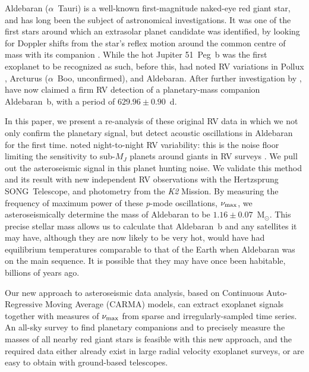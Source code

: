 \documentclass[modern]{aastex61}
\newcommand{\numax}{\mbox{$\nu_{\rm max}$}\xspace}
\newcommand{\msun}{\mbox{$\mathrm{M}_{\odot}$}\xspace}
\newcommand{\ktwo}{\emph{K2}\xspace}
\begin{document}
Aldebaran ($\alpha$~Tauri) is a well-known first-magnitude naked-eye red giant star, and has long been the subject of astronomical investigations. It was one of the first stars around which an extrasolar planet candidate was identified, by looking for Doppler shifts from the star's reflex motion around the common centre of mass with its companion \citep[the radial velocity or RV method;][]{struverv}. While the hot Jupiter 51~Peg~b \citep{51peg} was the first exoplanet to be recognized as such, before this, \citet{hatzes1993} had noted RV variations in Pollux \citep[$\beta$~Gem; subsequently confirmed as a planet:][]{betgemconf,betgemconf2}, Arcturus ($\alpha$~Boo, unconfirmed), and Aldebaran. After further investigation by \citet{Hatzes1998}, \citet{Hatzes2015} have now claimed a firm RV detection of a planetary-mass companion Aldebaran~b, with a period of $629.96 \pm 0.90$~d.

In this paper, we present a re-analysis of these original RV data in which we not only confirm the planetary signal, but detect acoustic oscillations in Aldebaran for the first time. \citet{hatzes1993} noted night-to-night RV variability: this is the noise floor limiting the sensitivity to sub-$M_J$ planets around giants in RV surveys \citep{2005PASJ...57...97S,2014A&A...566A.113J}. We pull out the asteroseismic signal in this planet hunting noise. We validate this method and its result with new independent RV observations with the Hertzsprung SONG~Telescope, and photometry from the \ktwo Mission. By measuring the frequency of maximum power of these \emph{p}-mode oscillations, \numax, we asteroseismically determine the mass of Aldebaran to be $1.16 \pm 0.07$~\msun. This precise stellar mass allows us to calculate that Aldebaran~b and any satellites it may have, although they are now likely to be very hot, would have had equilibrium temperatures comparable to that of the Earth when Aldebaran was on the main sequence. It is possible that they may have once been habitable, billions of years ago.

Our new approach to asteroseismic data analysis, based on Continuous Auto-Regressive Moving Average (CARMA) models, can extract exoplanet signals together with measures of \numax from sparse and irregularly-sampled time series. An all-sky survey to find planetary companions and to precisely measure the masses of all nearby red giant stars is feasible with this new approach, and the required data either already exist in large radial velocity exoplanet surveys, or are easy to obtain with ground-based telescopes.
\end{document}
